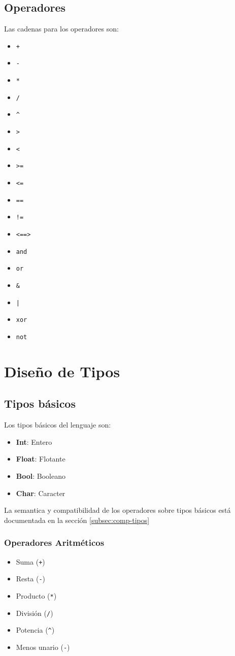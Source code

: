 \documentclass[12pt, spanish]{report}
\begin{document}
\section{Operadores}
\label{sec:agrup}
Las cadenas para los operadores son:
\begin{itemize}
\item \texttt{+}
\item \texttt{-}
\item \texttt{*}
\item \texttt{/}
\item \texttt{\^}
\item \texttt{>}
\item \texttt{<}
\item \texttt{>=}
\item \texttt{<=}
\item \texttt{==}
\item \texttt{!=}
\item \texttt{<==>}
\item \texttt{and}
\item \texttt{or}
\item \texttt{\&}
\item \texttt{|}
\item \texttt{xor}
\item \texttt{not}
\end{itemize}

\chapter{Dise\~no de Tipos}
\label{sec:tipos}

\section{Tipos b\'asicos}
\label{sec:tiposbasicos}

Los tipos b\'asicos del lenguaje son:

\begin{itemize}
\item \textbf{Int}: Entero
\item \textbf{Float}: Flotante
\item \textbf{Bool}: Booleano
\item \textbf{Char}: Caracter 
\end{itemize}
La semantica y compatibilidad de los operadores sobre 
tipos b\'asicos est\'a documentada en la secci\'on \ref{subsec:comp-tipos}

\subsection{Operadores Aritm\'eticos}
\begin{itemize}
\item Suma (\texttt{+})
\item Resta    (\texttt{-})
\item Producto (\texttt{*})
\item Divisi\'on  (\texttt{/})
\item Potencia (\texttt{\^})
\item Menos unario (\texttt{-})
\end{itemize}
\end{document}
